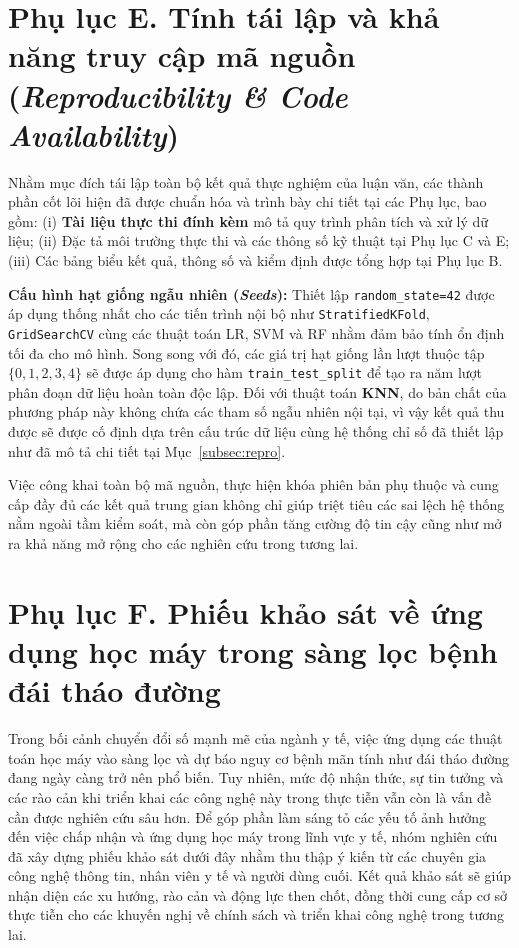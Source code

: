 \documentclass[14pt,a4paper]{extreport}
\begin{document}
\label{app:repro}
\label{app:code}
\label{app:seeds}
\section*{Phụ lục E. Tính tái lập và khả năng truy cập mã nguồn (\textit{Reproducibility \& Code Availability})}


Nhằm mục đích tái lập toàn bộ kết quả thực nghiệm của luận văn, các thành phần cốt lõi hiện đã được chuẩn hóa và trình bày chi tiết tại các Phụ lục, bao gồm: (i) \textbf{Tài liệu thực thi đính kèm} mô tả quy trình phân tích và xử lý dữ liệu; (ii) Đặc tả môi trường thực thi và các thông số kỹ thuật tại Phụ lục C và E; (iii) Các bảng biểu kết quả, thông số và kiểm định được tổng hợp tại Phụ lục B.

\textbf{Cấu hình hạt giống ngẫu nhiên (\textit{Seeds}):} 
Thiết lập \texttt{random\_state=42} được áp dụng thống nhất cho các tiến trình nội bộ như \texttt{StratifiedKFold}, \texttt{GridSearchCV} cùng các thuật toán LR, SVM và RF nhằm đảm bảo tính ổn định tối đa cho mô hình. Song song với đó, các giá trị hạt giống lần lượt thuộc tập $\{0, 1, 2, 3, 4\}$ sẽ được áp dụng cho hàm \texttt{train\_test\_split} để tạo ra năm lượt phân đoạn dữ liệu hoàn toàn độc lập. Đối với thuật toán \textbf{KNN}, do bản chất của phương pháp này không chứa các tham số ngẫu nhiên nội tại, vì vậy kết quả thu được sẽ được cố định dựa trên cấu trúc dữ liệu cùng hệ thống chỉ số đã thiết lập như đã mô tả chi tiết tại Mục~\ref{subsec:repro}.

\noindent Việc công khai toàn bộ mã nguồn, thực hiện khóa phiên bản phụ thuộc và cung cấp đầy đủ các kết quả trung gian không chỉ giúp triệt tiêu các sai lệch hệ thống nằm ngoài tầm kiểm soát, mà còn góp phần tăng cường độ tin cậy cũng như mở ra khả năng mở rộng cho các nghiên cứu trong tương lai.

\label{app:survey}
\section*{Phụ lục F. Phiếu khảo sát về ứng dụng học máy trong sàng lọc bệnh đái tháo đường}

Trong bối cảnh chuyển đổi số mạnh mẽ của ngành y tế, việc ứng dụng các thuật toán học máy vào sàng lọc và dự báo nguy cơ bệnh mãn tính như đái tháo đường đang ngày càng trở nên phổ biến. Tuy nhiên, mức độ nhận thức, sự tin tưởng và các rào cản khi triển khai các công nghệ này trong thực tiễn vẫn còn là vấn đề cần được nghiên cứu sâu hơn. Để góp phần làm sáng tỏ các yếu tố ảnh hưởng đến việc chấp nhận và ứng dụng học máy trong lĩnh vực y tế, nhóm nghiên cứu đã xây dựng phiếu khảo sát dưới đây nhằm thu thập ý kiến từ các chuyên gia công nghệ thông tin, nhân viên y tế và người dùng cuối. Kết quả khảo sát sẽ giúp nhận diện các xu hướng, rào cản và động lực then chốt, đồng thời cung cấp cơ sở thực tiễn cho các khuyến nghị về chính sách và triển khai công nghệ trong tương lai.
\end{document}
